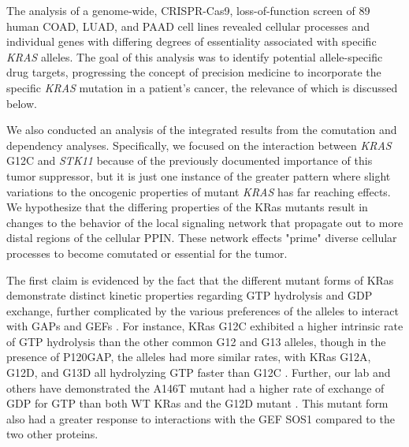 \documentclass[english, 10pt, letterpaper]{article}
\newcommand{\KRAS}{\emph{KRAS}}
\newcommand{\kras}{KRas}
\begin{document}
The analysis of a genome-wide, CRISPR-Cas9, loss-of-function screen of 89 human COAD, LUAD, and PAAD cell lines revealed cellular processes and individual genes with differing degrees of essentiality associated with specific \KRAS{} alleles.
The goal of this analysis was to identify potential allele-specific drug targets, progressing the concept of precision medicine to incorporate the specific \KRAS{} mutation in a patient's cancer, the relevance of which is discussed below.

We also conducted an analysis of the integrated results from the comutation and dependency analyses.
Specifically, we focused on the interaction between \KRAS{} G12C and \emph{STK11} because of the previously documented importance of this tumor suppressor, but it is just one instance of the greater pattern where slight variations to the oncogenic properties of mutant \KRAS{} has far reaching effects.
We hypothesize that the differing properties of the \kras{} mutants result in changes to the behavior of the local signaling network that propagate out to more distal regions of the cellular PPIN.
These network effects "prime" diverse cellular processes to become comutated or essential for the tumor.

The first claim is evidenced by the fact that the different mutant forms of \kras{} demonstrate distinct kinetic properties regarding GTP hydrolysis and GDP exchange, further complicated by the various preferences of the alleles to interact with GAPs and GEFs \cite{Smith2013, Hunter2015a}.
For instance, \kras{} G12C exhibited a higher intrinsic rate of GTP hydrolysis than the other common G12 and G13 alleles, though in the presence of P120GAP, the alleles had more similar rates, with \kras{} G12A, G12D, and G13D all hydrolyzing GTP faster than G12C \cite{Hunter2015a}.
Further, our lab and others have demonstrated the A146T mutant had a higher rate of exchange of GDP for GTP than both WT \kras{} and the G12D mutant \cite{Feig1988RelationshipProteins., Edkins2006, Janakiraman2010, Poulin2019}.
This mutant form also had a greater response to interactions with the GEF SOS1 compared to the two other proteins.
\end{document}
